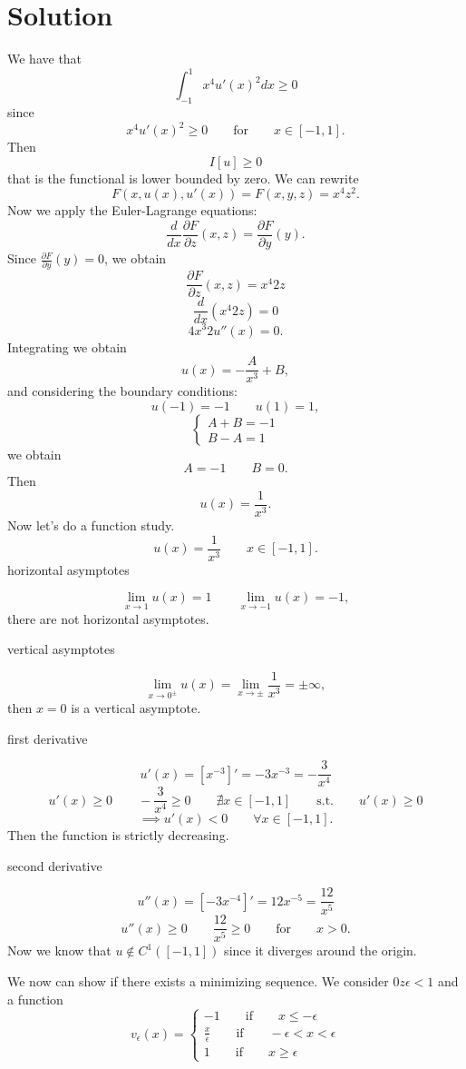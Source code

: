 \documentclass[a4paper, twoside, openany]{book}
\begin{document}
\section*{Solution}
We have that 
$$\int_{-1}^1 x^4 u'(x)^2 dx \geq 0$$
since
$$ x^4 u'(x)^2 \geq 0 \qquad \textrm{for} \qquad x \in [-1, 1].$$
Then 
$$I[u] \geq 0$$
that is the functional is lower bounded by zero. We can rewrite
$$F(x, u(x), u'(x)) = F(x, y, z) = x^4 z^2.$$
Now we apply the Euler-Lagrange equations:
$$\frac{d}{dx}\frac{\partial F}{\partial z}(x, z) = \frac{\partial F}{\partial y}(y).$$
Since $\frac{\partial F}{\partial y}(y)=0$, we obtain
$$\frac{\partial F}{\partial z}(x, z) = x^4 2 z$$
$$\frac{d}{dx}(x^4 2z) = 0$$
$$4x^3 2 u''(x) = 0.$$
Integrating we obtain
$$u(x) = -\frac{A}{x^3} + B,$$
and considering the boundary conditions:
$$u(-1) = -1 \qquad u(1) = 1,$$
$$\begin{cases}
A + B = -1 \\
B - A = 1
\end{cases}$$
we obtain
$$A = -1 \qquad B = 0.$$
Then
$$u(x) = \frac{1}{x^3}.$$
Now let's do a function study.
$$u(x) = \frac{1}{x^3} \qquad x \in [-1, 1].$$
horizontal asymptotes \par 
$$\lim_{x \rightarrow 1} u(x) = 1 \qquad \lim_{x \rightarrow -1} u(x) = -1,$$
there are not horizontal asymptotes. \par 
vertical asymptotes \par  
$$\lim_{x \rightarrow 0^{\pm}} u(x) = \lim_{x \rightarrow \pm} \frac{1}{x^3} = \pm \infty,$$
then $x = 0$ is a vertical asymptote. \par  
first derivative \par  
$$u'(x) = [x^{-3}]' = -3 x^{-3} = -\frac{3}{x^4}$$
$$u'(x) \geq 0 \qquad -\frac{3}{x^4} \geq 0 \qquad \nexists x \in [-1, 1] \qquad \textrm{s.t.} \qquad u'(x) \geq 0$$
$$\implies u'(x) < 0 \qquad \forall x \in [-1, 1].$$
Then the function is strictly decreasing. \par  
second derivative \par  
$$u''(x) = [-3 x^{-4}]' = 12 x^{-5} = \frac{12}{x^5}$$
$$u''(x) \geq 0 \qquad \frac{12}{x^5} \geq 0 \qquad \textrm{for} \qquad x > 0.$$
 Now we know that $u \notin C^1([-1, 1])$ since it diverges around the origin. \par 
 We now can show if there exists a minimizing sequence. We consider $0 z \epsilon < 1$ and a function
 $$v_{\epsilon}(x) = \begin{cases}
 						-1 \qquad \textrm{if} \qquad x \leq -\epsilon \\
 						\frac{x}{\epsilon} \qquad \textrm{if} \qquad -\epsilon < x < \epsilon \\
 						1 \qquad \textrm{if} \qquad x \geq \epsilon
 					 \end{cases}$$
\end{document}
